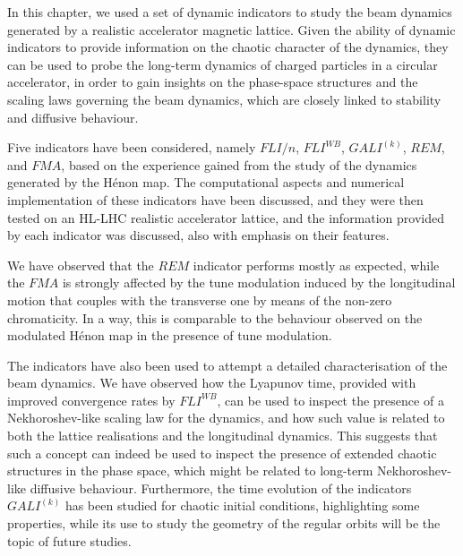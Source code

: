 In this chapter, we used a set of dynamic indicators to study the beam dynamics generated by a realistic accelerator magnetic lattice. Given the ability of dynamic indicators to provide information on the chaotic character of the dynamics, they can be used to probe the long-term dynamics of charged particles in a circular accelerator, in order to gain insights on the phase-space structures and the scaling laws governing the beam dynamics, which are closely linked to stability and diffusive behaviour.

Five indicators have been considered, namely $FLI/n$, $FLI^{WB}$, $GALI^{(k)}$, $REM$, and $FMA$, based on the experience gained from the study of the dynamics generated by the H\'enon map. The computational aspects and numerical implementation of these indicators have been discussed, and they were then tested on an HL-LHC realistic accelerator lattice, and the information provided by each indicator was discussed, also with emphasis on their features.

We have observed that the $REM$ indicator performs mostly as expected, while the $FMA$ is strongly affected by the tune modulation induced by the longitudinal motion that couples with the transverse one by means of the non-zero chromaticity. In a way, this is comparable to the behaviour observed on the modulated Hénon map in the presence of tune modulation. 

The indicators have also been used to attempt a detailed characterisation of the beam dynamics. We have observed how the Lyapunov time, provided with improved convergence rates by $FLI^{WB}$, can be used to inspect the presence of a Nekhoroshev-like scaling law for the dynamics, and how such value is related to both the lattice realisations and the longitudinal dynamics. This suggests that such a concept can indeed be used to inspect the presence of extended chaotic structures in the phase space, which might be related to long-term Nekhoroshev-like diffusive behaviour. Furthermore, the time evolution of the indicators $GALI^{(k)}$ has been studied for chaotic initial conditions, highlighting some properties, while its use to study the geometry of the regular orbits will be the topic of future studies.
